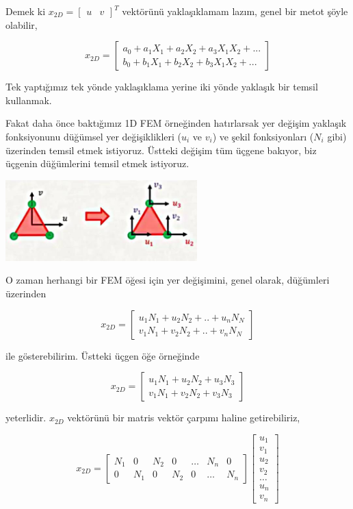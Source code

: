 \documentclass[12pt,fleqn]{article}\usepackage{../../common}
\begin{document}
Demek ki $x_{2D} = [\begin{array}{cc} u & v \end{array}]^T$ vektörünü
yaklaşıklamam lazım, genel bir metot şöyle olabilir,

$$
x_{2D} = \left[\begin{array}{c}
a_0 + a_1 X_1 + a_2 X_2 + a_3 X_1 X_2 + ...\\
b_0 + b_1 X_1 + b_2 X_2 + b_3 X_1 X_2 + ...
\end{array}\right]
$$

Tek yaptığımız tek yönde yaklaşıklama yerine iki yönde yaklaşık bir temsil
kullanmak. 

Fakat daha önce baktığımız 1D FEM örneğinden hatırlarsak yer değişim yaklaşık
fonksiyonunu düğümsel yer değişiklikleri ($u_i$ ve $v_i$) ve şekil fonksiyonları
($N_i$ gibi) üzerinden temsil etmek istiyoruz. Üstteki değişim tüm üçgene
bakıyor, biz üçgenin düğümlerini temsil etmek istiyoruz. 

\includegraphics[width=20em]{compscieng_bpp45fem3_04.jpg}

O zaman herhangi bir FEM öğesi için yer değişimini, genel olarak, düğümleri
üzerinden

$$
x_{2D} = \left[\begin{array}{c}
u_1 N_1 + u_2 N_2 + .. + u_n N_N \\
v_1 N_1 + v_2 N_2 + .. + v_n N_N
\end{array}\right]
$$

ile gösterebilirim. Üstteki üçgen öğe örneğinde 

$$
x_{2D} = \left[\begin{array}{c}
u_1 N_1 + u_2 N_2 + u_3 N_3 \\
v_1 N_1 + v_2 N_2 + v_3 N_3
\end{array}\right]
$$

yeterlidir. $x_{2D}$ vektörünü bir matris vektör çarpımı haline getirebiliriz,

$$
x_{2D} = \left[\begin{array}{ccccccc}
N_1 & 0 & N_2 & 0 & \dots & N_n & 0 \\
0 & N_1 & 0 & N_2 & 0 & \dots & N_n 
\end{array}\right]
\left[\begin{array}{c}
u_1 \\ v_1 \\ u_2 \\ v_2 \\ \dots \\ u_n \\ v_n
\end{array}\right]
$$
\end{document}
